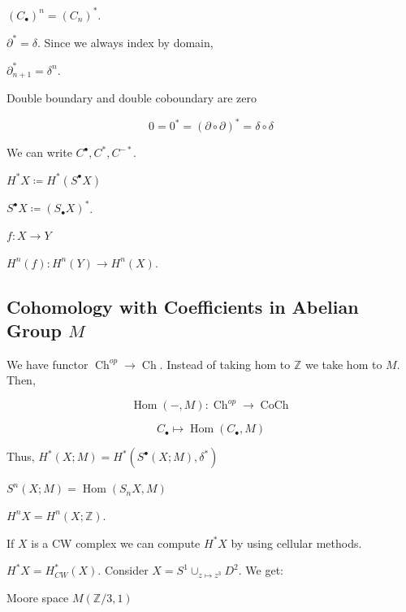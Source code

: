 \documentclass{article}
\theoremstyle{definition}
\begin{document}
    \((C_\bullet)^n = (C_n)^{\ast}\).

    \(\partial^{\ast} = \delta\). Since we always index by domain,

    \(\partial_{n+1}^{\ast} = \delta^n\).
    
    Double boundary and double coboundary are zero

    \[
        0 = 0^{\ast} = (\partial \circ \partial)^{\ast} = \delta \circ \delta
    \]

    We can write \(C^\bullet, C^{\ast}, C^{-\ast}\).

    \(H^{\ast} X \coloneqq H^{\ast} (S^\bullet X)\)

    \(S^\bullet X \coloneqq (S_\bullet X)^{\ast}\).

    \(f: X \to Y\) 

    \(H^n(f): H^n(Y) \to H^n(X)\).

    \subsection*{Cohomology with Coefficients in Abelian Group \(M\)}

    We have functor \(\operatorname{Ch}^{op} \to \operatorname{Ch}\). Instead of taking hom to \(\mathbb{Z}\) we take hom to \(M\). Then,

    \[
        \operatorname{Hom}(-,M): \operatorname{Ch}^{op} \to \operatorname{CoCh}
    \]

    \[
        C_\bullet \mapsto \operatorname{Hom}(C_\bullet, M)
    \]

    Thus, \(H^{\ast}(X;M) = H^{\ast} (S^\bullet(X;M),\delta^{\ast})\)
    
    \(S^n(X;M) = \operatorname{Hom}(S_n X, M)\) 

    \(H^n X = H^n(X;\mathbb{Z})\).

    If \(X\) is a CW complex we can compute \(H^{\ast} X\) by using cellular methods.

    \(H^{\ast} X = H^{\ast}_{CW}(X)\). Consider \(X = S^1 \cup_{z \mapsto z^3} D^2\). We get:

    \begin{center}
    \end{center}

    Moore space \(M(\mathbb{Z} / 3, 1)\) 
\end{document}
